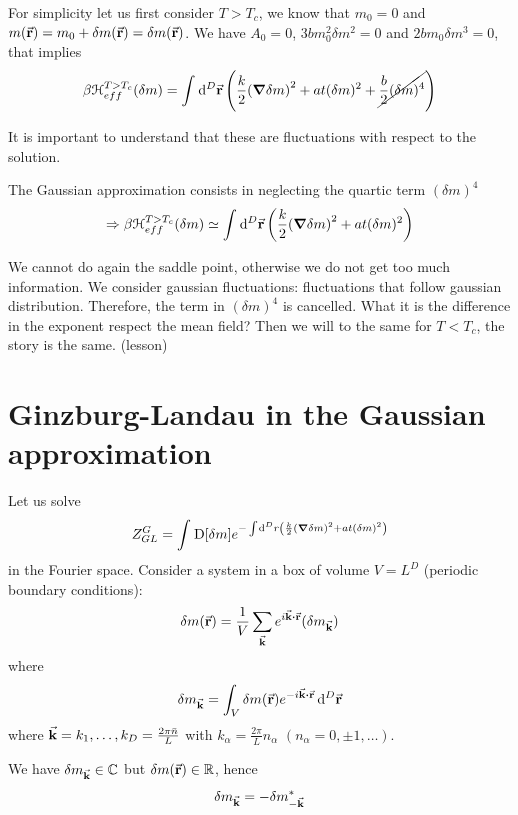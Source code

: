 \documentclass[../main/main.tex]{subfiles}
\begin{document}
For simplicity let us first consider \( T>T_c \),  we know that \( m_0 = 0 \) and
\( m (\va{r}) = m_0 + \delta m(\va{r}) = \delta m (\va{r}) \). We have \( A_0 =0 \), \( 3bm_0^2 \delta m^2 = 0 \) and \( 2 b m_0 \delta m^3 = 0 \), that implies
\begin{equation}
  \beta \mathcal{H}_{eff}^{T>T_c} (\delta m)= \int_{}^{} \dd[D]{\va{r}} \qty(\frac{k}{2} \qty(\grad \delta m)^2 + a t (\delta m)^2 + \cancel{\frac{b}{2} (\delta m)^4} )
\end{equation}
\begin{remark}
It is important to understand that these are fluctuations with respect to the solution.
\end{remark}
The Gaussian approximation consists in neglecting the quartic term \( (\delta m)^4 \)
\begin{equation}
  \Rightarrow
    \beta \mathcal{H}_{eff}^{T>T_c} (\delta m) \simeq  \int_{}^{} \dd[D]{\va{r}} \qty(\frac{k}{2} \qty(\grad \delta m)^2 + a t (\delta m)^2 )
\end{equation}
\begin{remark}
  We cannot do again the saddle point, otherwise we do not get too much information.
  We consider gaussian fluctuations: fluctuations that follow gaussian distribution.
  Therefore, the term in \( (\delta m)^4 \)  is cancelled.
  What it is the difference in the exponent respect the mean field?
  Then we will to the same for \( T < T_c \), the story is the same.
   (lesson)
\end{remark}

\section{Ginzburg-Landau in the Gaussian approximation}
Let us solve
\begin{equation}
  Z_{GL}^G = \int_{}^{} \text{D} \qty[\delta m] e^{- \int_{}^{} \dd[D]{r} \qty(\frac{k}{2} \qty(\grad \delta m)^2 + a t (\delta m)^2  )  }
 \end{equation}
 in the Fourier space.  Consider a system in a box of volume \( V = L^D \) (periodic boundary conditions):
 \begin{equation}
   \delta m (\va{r}) = \frac{1}{V} \sum_{\va{k}}  e^{i \va{k}\vdot \va{r}} (\delta m_{\va{k}})
 \end{equation}
where
\begin{equation}
  \delta m_{\va{k}} = \int_{V}^{}  \delta m (\va{r}) e^{-i \va{k} \vdot \va{r} }\dd[D]{\va{r}}
\end{equation}
where \( \va{k} = k_1, \dots, k_D = \frac{2 \pi  \bar{n} }{L}\) with \( k_ \alpha = \frac{2 \pi }{L} n_ \alpha  \) \( (n_ \alpha  = 0 , \pm 1, \dots) \).
\begin{remark}
  We have \( \delta m_{\va{k}} \in \mathbb{C} \) but \( \delta m (\va{r}) \in \mathbb{R} \), hence
  \begin{equation}
    \delta m_{\va{k}} = - \delta m^*_{-\va{k}}
  \end{equation}
\end{remark}
\end{document}
